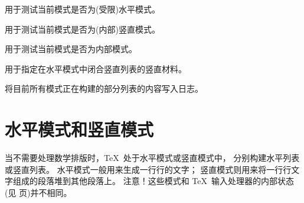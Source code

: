 \documentclass{book}
\begin{document}
\label{cschap:vadjust}\label{cschap:showlists}
\begin{inventory}
\item [\cs{ifhmode}] 
      用于测试当前模式是否为(受限)水平模式。

\item [\cs{ifvmode}] 
      用于测试当前模式是否为(内部)竖直模式。

\item [\cs{ifinner}] 
      用于测试当前模式是否为内部模式。

\item [\cs{vadjust}] 
      用于指定在水平模式中闭合竖直列表的竖直材料。

\item [\cs{showlists}] 
      将目前所有模式正在构建的部分列表的内容写入日志。
\end{inventory}

\section{水平模式和竖直模式}

当不需要处理数学排版时，\TeX\ 处于水平模式或竖直模式中，
分别构建水平列表或竖直列表。
水平模式一般用来生成一行行的文字；
竖直模式则用来将一行行文字组成的段落堆到其他段落上。
注意！这些模式和 \TeX\ 输入处理器的内部状态
(见 \pageref{input:states} 页)并不相同。
\end{document}
